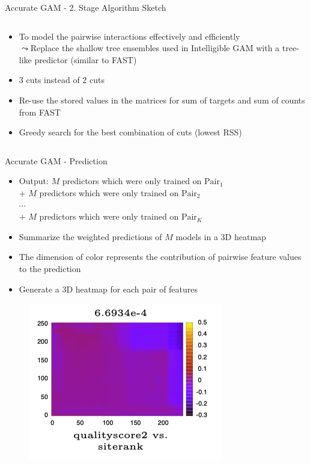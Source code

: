 \documentclass[11pt,compress,t,notes=noshow, aspectratio=169, xcolor=table]{beamer}
\begin{document}
\begin{frame}{Accurate GAM - 2. Stage Algorithm Sketch}
\begin{columns}[T, totalwidth=\textwidth]
\begin{column}{0.7\textwidth}
\begin{itemize}
            \item To model the pairwise interactions effectively and efficiently\\
            $\leadsto$Replace the shallow tree ensembles used in Intelligible GAM with a tree-like predictor (similar to FAST)
            \item 3 cuts instead of 2 cuts
            \item Re-use the stored values in the matrices for sum of targets and sum of counts from FAST
            \item Greedy search for the best combination of cuts (lowest RSS)
        \end{itemize}
    \end{column}
\end{columns}

\end{frame}

\begin{frame}{Accurate GAM - Prediction}
\begin{itemize}
    \item Output: $M$ predictors which were only trained on $\text{Pair}_1$ \\
    \qquad\;\; + $M$ predictors which were only trained on $\text{Pair}_2$ \\
    \qquad\;\; $\cdots$ \\
    \qquad\;\; + $M$ predictors which were only trained on $\text{Pair}_K$
    \item Summarize the weighted predictions of $M$ models in a 3D heatmap
    \item The dimension of color represents the contribution of pairwise feature values to the prediction
    \item Generate a 3D heatmap for each pair of features
\end{itemize}

\begin{figure}    
    \includegraphics[width=0.4\linewidth]
    {slides/02_interpretable-models/figure/3D Heatmap.png}
    \label{fig:3D Heatmap}
\end{figure}

\end{frame}
\end{document}
